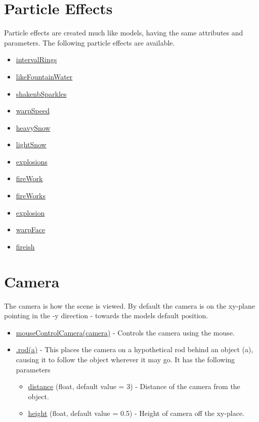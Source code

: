 \documentclass[10pt]{article}
\begin{document}
\section*{Particle Effects}
Particle effects are created much like models, having the same attributes and parameters.
The following particle effects are available.
\begin{itemize}
    \item \underline{intervalRings}
    \item \underline{likeFountainWater}
    \item \underline{shakenbSparkles}
    \item \underline{warpSpeed}
    \item \underline{heavySnow}
    \item \underline{lightSnow}
    \item \underline{explosions}
    \item \underline{fireWork}
    \item \underline{fireWorks}
    \item \underline{explosion}
    \item \underline{warpFace}
    \item \underline{fireish}
\end{itemize}



\section*{Camera}
The camera is how the scene is viewed.
By default the camera is on the xy-plane pointing in the -y direction - towards the models default position.
\begin{itemize}
    \item  \underline{mouseControlCamera(camera)} - Controls the camera using the mouse.
    \item \underline{.rod(a)} - This places the camera on a hypothetical rod behind an object (a), causing it to follow the object wherever it may go.
    It has the following parameters
    \begin{itemize}
        \item \underline{distance} (float, default value = 3) - Distance of the camera from the object.
        \item \underline{height} (float, default value = 0.5) - Height of camera off the xy-place.
    \end{itemize}
\end{itemize}
\end{document}
